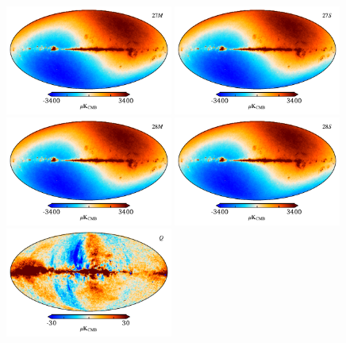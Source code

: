 \documentclass{aa}
\begin{document}
\begin{figure}
  \centering
  \includegraphics[width=0.49\textwidth]{figs/sim_T_27M.pdf}
  \includegraphics[width=0.49\textwidth]{figs/sim_T_27S.pdf}\\
  \includegraphics[width=0.49\textwidth]{figs/sim_T_28M.pdf}
  \includegraphics[width=0.49\textwidth]{figs/sim_T_28S.pdf}\\
  \includegraphics[width=0.49\textwidth]{figs/sim_Q.pdf}

\end{figure}
\end{document}
